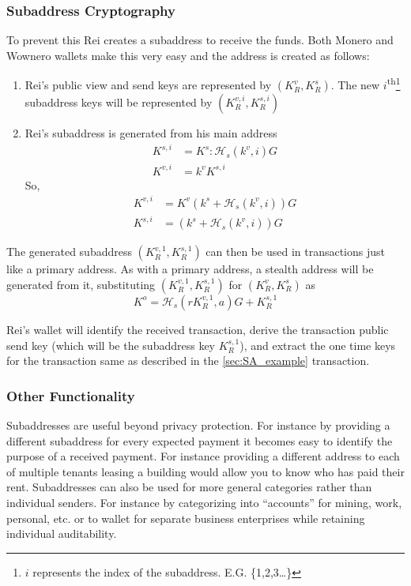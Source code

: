 \subsubsection{Subaddress Cryptography}
To prevent this Rei creates a subaddress to receive the funds.
Both Monero and Wownero wallets make this very easy and the address is created as follows\cite{zero2monero}:
\begin{enumerate}
    \item Rei's public view and send keys are represented by $(K^v_R,K^s_R)$. The new $i$\textsuperscript{th}\footnote{$i$ represents the index of the subaddress. E.G. \{1,2,3\dots\}} subaddress keys will be represented by $(K^{v,i}_R,K^{s,i}_R)$
    \item Rei's subaddress is generated from his main address
    \begin{align*}
        K^{s,i} &= K^s:\mathcal{H}_s(k^v,i)G\\
        K^{v,i} &= k^vK^{s,i}
    \end{align*}
    So,
    \begin{align*}
        K^{v,i} &= K^v(k^s+\mathcal{H}_s(k^v,i))G\\
        K^{s,i} &= (k^s+\mathcal{H}_s(k^v,i))G
    \end{align*}\cite{zero2monero}
\end{enumerate}

The generated subaddress $(K^{v,1}_R,K^{s,1}_R)$ can then be used in transactions just like a primary address. As with a primary address, a stealth address will be generated from it, substituting $(K^{v,1}_R,K^{s,1}_R)$ for $(K^{v}_R,K^{s}_R)$ as
\[K^o=\mathcal{H}_s(rK^{v,1}_R, a)G+K^{s,1}_R\]

Rei's wallet will identify the received transaction, derive the transaction public send key (which will be the subaddress key $K^{s,1}_R$), and extract the one time keys for the transaction same as described in the \ref{sec:SA_example} transaction.

\subsubsection{Other Functionality}
Subaddresses are useful beyond privacy protection. For instance by providing a different subaddress for every expected payment it becomes easy to identify the purpose of a received payment\cite{monerodoc_subaddr}. For instance providing a different address to each of multiple tenants leasing a building would allow you to know who has paid their rent.
Subaddresses can also be used for more general categories rather than individual senders. For instance by categorizing into ``accounts'' for mining, work, personal, etc. or to wallet for separate business enterprises while retaining individual auditability\cite{monerodoc_subaddr}.


